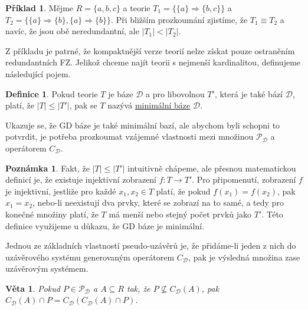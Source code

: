 \documentclass{article}
\newtheorem{theorem}{Věta}
\theoremstyle {definition}
\newtheorem{definition}{Definice}
\newtheorem{example}{Příklad}
\newtheorem*{remark}{Poznámka}
\begin{document}
\begin {example}
  Mějme $R=\{a,b,c\}$ a teorie $T_1=\{\{a\}\Rightarrow \{b,c\}\}$ a
  $T_2=\{\{a\}\Rightarrow \{b\}, \{a\}\Rightarrow \{b\}\}$. Při
  bližším prozkoumání zjistíme, že $T_1\equiv T_2$ a navíc, že jsou
  obě neredundantní, ale $|T_1| < |T_2|$.
\end {example}

Z příkladu je patrné, že kompaktnější verze teorií nelze získat pouze
ostraněním redundantních FZ. Jelikož chceme najít teorii s nejmenší
kardinalitou, definujeme následující pojem.

\begin{definition}
  Pokud teorie $T$ je báze $\mathcal{D}$ a pro libovolnou $T'$, která je také
  bází $\mathcal{D}$, platí, že $|T| \leq |T'|$, pak se $T$ nazývá
  \underline{minimální báze} $\mathcal{D}$.
\end{definition}

Ukazuje se, že GD báze je také minimální bazí, ale abychom byli
schopni to potvrdit, je potřeba prozkoumat vzájemné vlastnosti mezi
množinou $\mathcal P_{\mathcal{D}}$ a operátorem $C_{\mathcal{D}}$.

\begin {remark}
  Fakt, že $|T| \leq |T'|$ intuitivně chápeme, ale přesnou
  matematickou definicí je, že existuje injektivní zobrazení $f:T
  \rightarrow T'$. Pro připomenutí, zobrazení $f$ je injektivní,
  jestliže pro každé $x_1,x_2\in T$ platí, že pokud $f(x_1)=f(x_2)$,
  pak $x_1=x_2$, nebo-li neexistují dva prvky, které se zobrazí na to
  samé, a tedy pro konečné množiny platí, že $T$ má menší nebo stejný
  počet prvků jako $T'$. Této definice využijeme u důkazu, že GD báze
  je minimální.
\end {remark}

Jednou ze základních vlastností pseudo-uzávěrů je, že přidáme-li jeden
z nich do uzávěrového systému generovaným operátorem
$C_{\mathcal{D}}$, pak je výsledná množina zase uzávěrovým systémem.

\begin{theorem}
  Pokud $P \in \mathcal P_{\mathcal{D}}$ a $A \subseteq R$ tak, že $P
  \not\subseteq C_{\mathcal{D}}(A)$, pak $C_{\mathcal{D}}(A) \cap P =
  C_{\mathcal{D}}(C_{\mathcal{D}}(A) \cap P)$.
\end{theorem}
\end{document}
